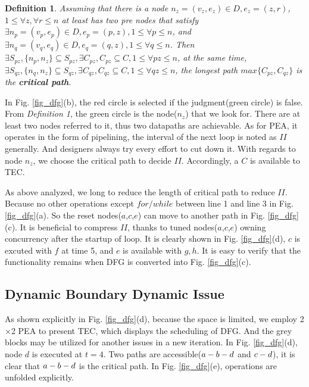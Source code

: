\documentclass[10pt, conference, compsocconf]{IEEEtran}
\newtheorem{defn}{Definition}
\begin{document}
\begin{defn} Assuming that there is a node $n_z=(v_{z},e_{z})\in D,e_{z} = (z,r)$, $1 \leq \forall z,\forall r \leq n$ at least has two pre nodes that satisfy $\exists n_p = (v_{p},e_{p}) \in D, e_{p}=(p,z), 1 \leq \forall p \leq n$, and $\exists n_q = (v_{q},e_{q}) \in D, e_{q}=(q,z), 1 \leq \forall q \leq n$. Then $\exists S_{pz}, \{n_p,n_z\} \subseteq S_{pz}, \exists C_{pz}, C_{pz}\subseteq C, 1 \leq \forall pz \leq n$, at the same time, $\exists S_{qz}, \{n_q,n_z\}\subseteq S_{qz}, \exists C_{qz}, C_{qz} \subseteq C, 1 \leq \forall qz \leq n$, the longest path $max\{C_{pz},C_{qz}\}$ is the \textbf{critical path}. \end{defn}

In Fig. \ref{fig_dfg}(b), the red circle is selected if the judgment(green circle) is false. From \textit{Definition 1}, the green circle is the node($n_z$) that we look for. There are at least two nodes referred to it, thus two datapaths are achievable. As for PEA, it operates in the form of pipelining, the interval of the next loop is noted as $II$ generally. And designers always try every effort to cut down it. With regards to node $n_z$, we choose the critical path to decide $II$. Accordingly, a $C$ is available to TEC.

As above analyzed, we long to reduce the length of critical path to reduce $II$. Because no other operations except $for/while$ between line 1 and line 3 in Fig. \ref{fig_dfg}(a). So the reset nodes($a$,$c$,$e$) can move to another path in  Fig. \ref{fig_dfg}(c). It is beneficial to compress $II$, thanks to tuned nodes($a$,$c$,$e$) owning concurrency after the startup of loop. It is clearly shown in  Fig. \ref{fig_dfg}(d), $c$ is excuted with $f$ at time 5, and $e$ is available with $g,h$. It is easy to verify that the functionality remains when DFG is converted into Fig. \ref{fig_dfg}(c).

\subsection{Dynamic Boundary Dynamic Issue}
As shown explicitly in Fig. \ref{fig_dfg}(d), because the space is limited, we employ 2$\times$2 PEA to present TEC, which displays the scheduling of DFG. And the grey blocks may be utilized for another issues in a new iteration. In Fig. \ref{fig_dfg}(d), node $d$ is executed at $t = 4$. Two paths are accessible($a\--b\--d $ and $c\--d$), it is clear that $a\--b\--d $ is the critical path. In Fig. \ref{fig_dfg}(e), operations are unfolded explicitly. 
\end{document}
